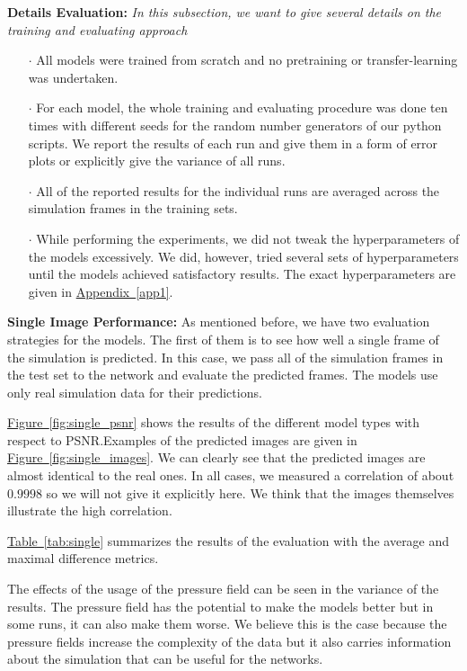 \documentclass{llncs}
\newcommand{\reffig}[1]{\hyperref[#1]{Figure~\ref*{#1}}}
\newcommand{\reftab}[1]{\hyperref[#1]{Table~\ref*{#1}}}
\newcommand{\refapp}[1]{\hyperref[#1]{Appendix~\ref*{#1}}}
\begin{document}
\noindent\textbf{Details Evaluation:}
\emph{In this subsection, we want to give several details on the training and evaluating approach}
\begin{itemize}
\item[$\cdot$] All models were trained from scratch and no pretraining or transfer-learning was undertaken.
\item[$\cdot$] For each model, the whole training and evaluating procedure was done ten times with different seeds for the random number generators of our python scripts. We report the results of each run and give them in a form of error plots or explicitly give the variance of all runs.
\item[$\cdot$] All of the reported results for the individual runs are averaged across the simulation frames in the training sets.
\item[$\cdot$] While performing the experiments, we did not tweak the hyperparameters of the models excessively. We did, however, tried several sets of hyperparameters until the models achieved satisfactory results. The exact hyperparameters are given in \refapp{app1}.
\end{itemize}

\noindent\textbf{Single Image Performance:}
As mentioned before, we have two evaluation strategies for the models. The first of them is to see how well a single frame of the simulation is predicted. In this case, we pass all of the simulation frames in the test set to the network and evaluate the predicted frames. The models use only real simulation data for their predictions.

\reffig{fig:single_psnr} shows the results of the different model types with respect to PSNR.\@ Examples of the predicted images are given in \reffig{fig:single_images}. We can clearly see that the predicted images are almost identical to the real ones. In all cases, we measured a correlation of about $0.9998$ so we will not give it explicitly here. We think that the images themselves illustrate the high correlation.

\reftab{tab:single} summarizes the results of the evaluation with the average and maximal difference metrics.

The effects of the usage of the pressure field can be seen in the variance of the results. The pressure field has the potential to make the models better but in some runs, it can also make them worse. We believe this is the case because the pressure fields increase the complexity of the data but it also carries information about the simulation that can be useful for the networks.
\end{document}

